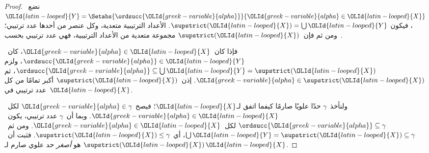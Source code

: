 \documentclass[../../../include/open-logic-section]{subfiles}
\begin{document}
\begin{proof}
نضع~$\OLId{latin-looped}{Y} = \Setabs{\ordsucc{\OLId{greek-variable}{alpha}}}{\OLId{greek-variable}{alpha} \in \OLId{latin-looped}{X}}$، فيكون
$\supstrict(\OLId{latin-looped}{X}) = \bigcup \OLId{latin-looped}{Y}$. الأعداد الترتيبية متعدية، وكل عنصر
من أحدها عدد ترتيبي؛ ومن ثم فإن~$\supstrict(\OLId{latin-looped}{X})$ مجموعة متعدية من
الأعداد الترتيبية، فهي عدد ترتيبي بحسب~.

فإذا كان~$\OLId{greek-variable}{alpha} \in \OLId{latin-looped}{X}$، كان~$\ordsucc{\OLId{greek-variable}{alpha}} \in \OLId{latin-looped}{Y}$، ولزم
$\ordsucc{\OLId{greek-variable}{alpha}} \subseteq \bigcup \OLId{latin-looped}{Y} = \supstrict(\OLId{latin-looped}{X})$، ثم
$\OLId{greek-variable}{alpha} \in \supstrict(\OLId{latin-looped}{X})$. إذن~$\supstrict(\OLId{latin-looped}{X})$ أكبر تمامًا من
كل عدد ترتيبي في~$\OLId{latin-looped}{X}$.

ولنأخذ~$\gamma$ حدًا علويًا صارمًا كيفما اتفق لـ$\OLId{latin-looped}{X}$؛ فيصح
$\OLId{greek-variable}{alpha} \in \gamma$ لكل~$\OLId{greek-variable}{alpha} \in \OLId{latin-looped}{X}$. وبما أن~$\gamma$ عدد
ترتيبي، يكون~$\ordsucc{\OLId{greek-variable}{alpha}} \subseteq \gamma$ لكل~$\OLId{greek-variable}{alpha} \in \OLId{latin-looped}{X}$.
ومن ثم~$\bigcup \OLId{latin-looped}{Y} = \supstrict(\OLId{latin-looped}{X}) \subseteq \gamma$، أي
$\supstrict(\OLId{latin-looped}{X}) \leq \gamma$. فثبت أن~$\supstrict(\OLId{latin-looped}{X})$ هو \emph{أصغر}
حد علوي صارم لـ$\OLId{latin-looped}{X}$.
\end{proof}
\end{document}

